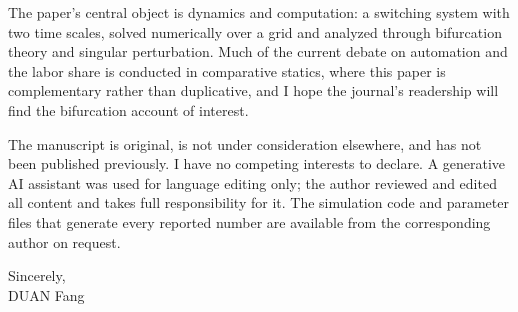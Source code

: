 \documentclass[11pt]{article}
\begin{document}
The paper's central object is dynamics and computation: a switching system with two time scales, solved numerically over a grid and analyzed through bifurcation theory and singular perturbation. Much of the current debate on automation and the labor share is conducted in comparative statics, where this paper is complementary rather than duplicative, and I hope the journal's readership will find the bifurcation account of interest.

The manuscript is original, is not under consideration elsewhere, and has not been published previously. I have no competing interests to declare. A generative AI assistant was used for language editing only; the author reviewed and edited all content and takes full responsibility for it. The simulation code and parameter files that generate every reported number are available from the corresponding author on request.

\vspace{6pt}
Sincerely,\\
DUAN Fang
\end{document}
